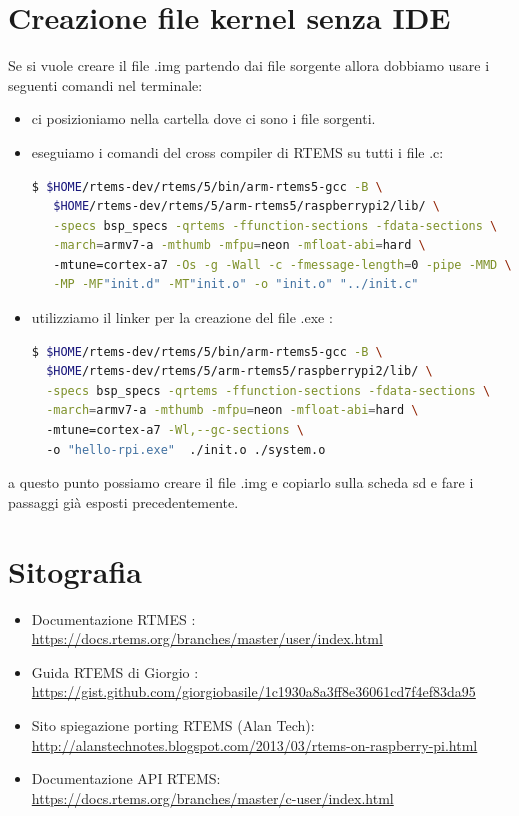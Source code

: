 \documentclass[12pt, a4paper]{article}
\begin{document}
\begin{flushleft}
\newpage
\section{Creazione file kernel senza IDE}
Se si vuole creare il file .img partendo dai file sorgente allora dobbiamo usare i seguenti comandi nel terminale:
\begin{itemize}
\item ci posizioniamo nella cartella dove ci sono i file sorgenti.
\item eseguiamo i comandi del cross compiler di RTEMS su tutti i file .c: 
\begin{lstlisting}[language= bash] 
 $ $HOME/rtems-dev/rtems/5/bin/arm-rtems5-gcc -B \
   $HOME/rtems-dev/rtems/5/arm-rtems5/raspberrypi2/lib/ \
   -specs bsp_specs -qrtems -ffunction-sections -fdata-sections \
   -march=armv7-a -mthumb -mfpu=neon -mfloat-abi=hard \ 
   -mtune=cortex-a7 -Os -g -Wall -c -fmessage-length=0 -pipe -MMD \
   -MP -MF"init.d" -MT"init.o" -o "init.o" "../init.c"
\end{lstlisting}
\item utilizziamo il linker per la creazione del file .exe :
\begin{lstlisting}[language= bash] 
$ $HOME/rtems-dev/rtems/5/bin/arm-rtems5-gcc -B \
  $HOME/rtems-dev/rtems/5/arm-rtems5/raspberrypi2/lib/ \
  -specs bsp_specs -qrtems -ffunction-sections -fdata-sections \
  -march=armv7-a -mthumb -mfpu=neon -mfloat-abi=hard \ 
  -mtune=cortex-a7 -Wl,--gc-sections \ 
  -o "hello-rpi.exe"  ./init.o ./system.o    
\end{lstlisting}

\end{itemize}
\item a questo punto possiamo creare il file .img e copiarlo sulla scheda sd e fare i passaggi già esposti precedentemente.

\newpage
\section{Sitografia}
\begin{itemize}
\item Documentazione RTMES :\\ \url{https://docs.rtems.org/branches/master/user/index.html}
\item Guida RTEMS di Giorgio :\\ \url{https://gist.github.com/giorgiobasile/1c1930a8a3ff8e36061cd7f4ef83da95}
\item Sito spiegazione porting RTEMS (Alan Tech):\\ \url{http://alanstechnotes.blogspot.com/2013/03/rtems-on-raspberry-pi.html} 
\item Documentazione API RTEMS:\\ \url{https://docs.rtems.org/branches/master/c-user/index.html}
\end{itemize}

\end{flushleft}
\end{document}
